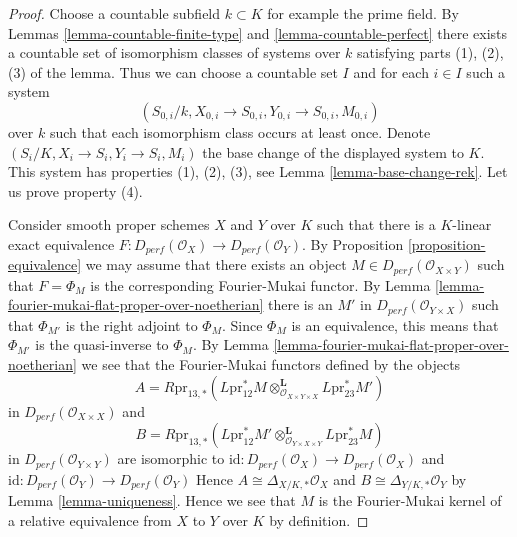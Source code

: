 \begin{proof}
Choose a countable subfield $k \subset K$ for example the prime field.
By Lemmas \ref{lemma-countable-finite-type} and \ref{lemma-countable-perfect}
there exists a countable set of isomorphism classes of systems
over $k$ satisfying parts (1), (2), (3) of the lemma.
Thus we can choose a countable set
$I$ and for each $i \in I$ such a system
$$
(S_{0, i}/k, X_{0, i} \to S_{0, i}, Y_{0, i} \to S_{0, i}, M_{0, i})
$$
over $k$ such that each isomorphism class occurs at least once.
Denote $(S_i/K, X_i \to S_i, Y_i \to S_i, M_i)$ the base change
of the displayed system to $K$. This system has properties (1), (2), (3),
see Lemma \ref{lemma-base-change-rek}. Let us prove property (4).

\medskip\noindent
Consider smooth proper schemes $X$ and $Y$ over $K$
such that there is a $K$-linear exact equivalence
$F : D_{perf}(\mathcal{O}_X) \to D_{perf}(\mathcal{O}_Y)$.
By Proposition \ref{proposition-equivalence}
we may assume that there exists an object
$M \in D_{perf}(\mathcal{O}_{X \times Y})$
such that $F = \Phi_M$ is the corresponding Fourier-Mukai functor.
By Lemma \ref{lemma-fourier-mukai-flat-proper-over-noetherian}
there is an $M'$ in $D_{perf}(\mathcal{O}_{Y \times X})$
such that $\Phi_{M'}$ is the right adjoint to $\Phi_M$.
Since $\Phi_M$ is an equivalence, this means that
$\Phi_{M'}$ is the quasi-inverse to $\Phi_M$.
By Lemma \ref{lemma-fourier-mukai-flat-proper-over-noetherian}
we see that the Fourier-Mukai functors defined by the objects
$$
A = R\text{pr}_{13, *}(
L\text{pr}_{12}^*M
\otimes_{\mathcal{O}_{X \times Y \times X}}^\mathbf{L}
L\text{pr}_{23}^*M')
$$
in $D_{perf}(\mathcal{O}_{X \times X})$ and
$$
B = R\text{pr}_{13, *}(
L\text{pr}_{12}^*M'
\otimes_{\mathcal{O}_{Y \times X \times Y}}^\mathbf{L}
L\text{pr}_{23}^*M)
$$
in $D_{perf}(\mathcal{O}_{Y \times Y})$ 
are isomorphic to
$\text{id} : D_{perf}(\mathcal{O}_X) \to D_{perf}(\mathcal{O}_X)$
and
$\text{id} : D_{perf}(\mathcal{O}_Y) \to D_{perf}(\mathcal{O}_Y)$
Hence
$A \cong \Delta_{X/K, *}\mathcal{O}_X$ and
$B \cong \Delta_{Y/K, *}\mathcal{O}_Y$
by Lemma \ref{lemma-uniqueness}. Hence we see that $M$ is the
Fourier-Mukai kernel of a relative equivalence from $X$ to $Y$
over $K$ by definition.


\end{proof}
